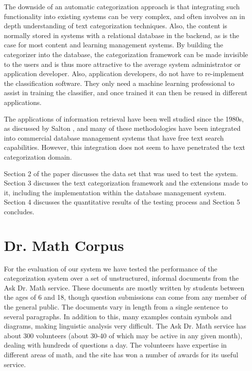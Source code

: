 \documentclass[twocolumn]{article}
\begin{document}
The downside of an automatic categorization approach is that integrating such 
functionality into existing systems can be very complex, and often involves an in 
depth understanding of text categorization techniques.  Also, the content is normally 
stored in systems with a relational database in the backend, as is the case for most 
content and learning management systems. By building the categorizer into the 
database, the categorization framework\cite{williams:02} can be made invisible to the 
users and is thus more attractive to the average system administrator or application 
developer. Also, application developers, do not have to re-implement the 
classification software. They only need a machine learning professional to assist in 
training the classifier, and once trained it can then be reused in different applications. 

The applications of information retrieval have been well studied since the 1980s, as 
discussed by Salton \cite{salton:89,salton:91}, and many of these methodologies have been 
integrated into commercial database management systems that have free text search 
capabilities. However, this integration does not seem to have penetrated the text 
categorization domain.

Section 2 of the paper discusses the data set that was used to test
the system. Section 3 discusses the text categorization framework and
the extensions made to it, including the implementation within the
database management system. Section 4 discusses the quantitative
results of the testing process and Section 5 concludes.

\section{Dr. Math Corpus}
\label{corpus}

For the evaluation of our system we have tested the performance of the
categorization system over a set of unstructured, informal documents
from the Ask Dr. Math service.\cite{drmath} These documents are mostly
written by students between the ages of 6 and 18, though question
submissions can come from any member of the general public.  The documents vary
in length from a single sentence to several paragraphs. In addition to
this, many examples contain symbols and diagrams, making linguistic
analysis very difficult. The Ask Dr. Math service has about 300
volunteers (about 30-40 of which may be active in any given month),
dealing with hundreds of questions a day. The volunteers have
expertise in different areas of math, and the site has won a number of
awards for its useful service.
\end{document}
